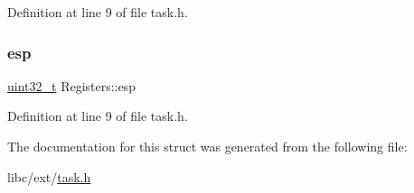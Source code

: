 Definition at line 9 of file task.\+h.

\mbox{\label{a00132_aca352215ac1e37f833da4f6289392261_aca352215ac1e37f833da4f6289392261}} 
\subsubsection{\texorpdfstring{esp}{esp}}
{\footnotesize\ttfamily \hyperlink{a00095_a435d1572bf3f880d55459d9805097f62_a435d1572bf3f880d55459d9805097f62}{uint32\+\_\+t} Registers\+::esp}



Definition at line 9 of file task.\+h.



The documentation for this struct was generated from the following file\+:\begin{DoxyCompactItemize}
\item 
libc/ext/\hyperlink{a00050}{task.\+h}\end{DoxyCompactItemize}

